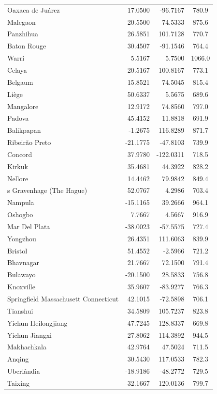 \begin{longtable}{lrrc}
Oaxaca de Juárez & 17.0500 & -96.7167 & 780.9 \\
Malegaon & 20.5500 & 74.5333 & 875.6 \\
Panzhihua & 26.5851 & 101.7128 & 770.7 \\
Baton Rouge & 30.4507 & -91.1546 & 764.4 \\
Warri & 5.5167 & 5.7500 & 1066.0 \\
Celaya & 20.5167 & -100.8167 & 773.1 \\
Belgaum & 15.8521 & 74.5045 & 815.4 \\
Liège & 50.6337 & 5.5675 & 689.6 \\
Mangalore & 12.9172 & 74.8560 & 797.0 \\
Padova & 45.4152 & 11.8818 & 691.9 \\
Balikpapan & -1.2675 & 116.8289 & 871.7 \\
Ribeirão  Preto & -21.1775 & -47.8103 & 739.9 \\
Concord & 37.9780 & -122.0311 & 718.5 \\
Kirkuk & 35.4681 & 44.3922 & 828.2 \\
Nellore & 14.4462 & 79.9842 & 849.4 \\
s Gravenhage (The Hague) & 52.0767 & 4.2986 & 703.4 \\
Nampula & -15.1165 & 39.2666 & 964.1 \\
Oshogbo & 7.7667 & 4.5667 & 916.9 \\
Mar Del Plata & -38.0023 & -57.5575 & 727.4 \\
Yongzhou & 26.4351 & 111.6063 & 839.9 \\
Bristol & 51.4552 & -2.5966 & 721.2 \\
Bhavnagar & 21.7667 & 72.1500 & 791.4 \\
Bulawayo & -20.1500 & 28.5833 & 756.8 \\
Knoxville & 35.9607 & -83.9277 & 766.3 \\
Springfield  Massachusett  Connecticut & 42.1015 & -72.5898 & 706.1 \\
Tianshui & 34.5809 & 105.7237 & 823.8 \\
Yichun  Heilongjiang & 47.7245 & 128.8337 & 669.8 \\
Yichun  Jiangxi & 27.8062 & 114.3892 & 944.5 \\
Makhachkala & 42.9764 & 47.5024 & 711.5 \\
Anqing & 30.5430 & 117.0533 & 782.3 \\
Uberlândia & -18.9186 & -48.2772 & 729.5 \\
Taixing & 32.1667 & 120.0136 & 799.7 \\

\end{longtable}
